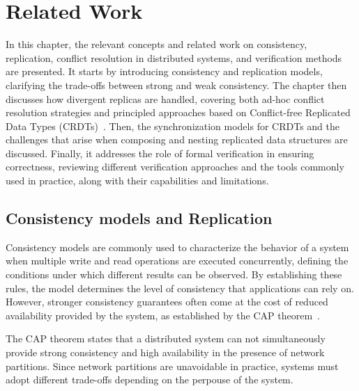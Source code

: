 
%

\chapter{Related Work}
\label{cha:related_work}

In this chapter, the relevant concepts and related work on consistency, replication, conflict resolution in distributed systems, and verification methods are presented. It starts by introducing consistency and replication models, clarifying the trade-offs between strong and weak consistency. The chapter then discusses how divergent replicas are handled, covering both ad-hoc conflict resolution strategies and principled approaches based on Conflict-free Replicated Data Types (CRDTs)~\cite{preguica2018overview}. Then, the synchronization models for CRDTs and the challenges that arise when composing and nesting replicated data structures are discussed. Finally, it addresses the role of formal verification in ensuring correctness, reviewing different verification approaches and the tools commonly used in practice, along with their capabilities and limitations.

\glsresetall

\section{Consistency models and Replication}
\label{sec:consistency}

Consistency models are commonly used to characterize the behavior of a system when multiple write and read operations are executed concurrently, defining the conditions under which different results can be observed. By establishing these rules, the model determines the level of consistency that applications can rely on. However, stronger consistency guarantees often come at the cost of reduced availability provided by the system, as established by the CAP theorem~\cite{cap-theorem}.

The CAP theorem states that a distributed system can not simultaneously provide strong consistency and high availability in the presence of network partitions. Since network partitions are unavoidable in practice, systems must adopt different trade-offs depending on the perpouse of the system.

